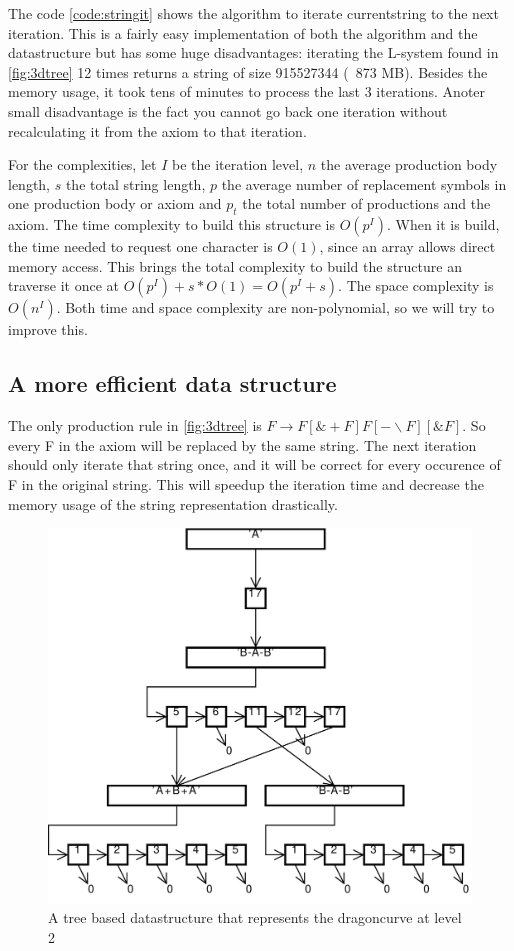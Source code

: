 \documentclass[11pt,a4paper]{article}
\begin{document}
The code \ref{code:stringit} shows the algorithm to iterate currentstring to the next iteration. This is a fairly easy implementation of both the algorithm and the datastructure but has some huge disadvantages: iterating the L-system found in \ref{fig:3dtree} 12 times returns a string of size 915527344 (~873 MB). Besides the memory usage, it took tens of minutes to process the last 3 iterations. Anoter small disadvantage is the fact you cannot go back one iteration without recalculating it from the axiom to that iteration.

For the complexities, let $I$ be the iteration level, $n$ the average production body length, $s$ the total string length, $p$ the average number of replacement symbols in one production body or axiom and $p_t$ the total number of productions and the axiom.
The time complexity to build this structure is $O(p^I)$. When it is build, the time needed to request one character is $O(1)$, since an array allows direct memory access. This brings the total complexity to build the structure an traverse it once at $O(p^I)+s*O(1) = O(p^I+s)$.
The space complexity is $O(n^I)$. Both time and space complexity are non-polynomial, so we will try to improve this.

\subsection{A more efficient data structure} %

The only production rule in \ref{fig:3dtree} is $F \rightarrow F[\&+F]F[-\backslash F][\&F]$. So every F in the axiom will be replaced by the same string. The next iteration should only iterate that string once, and it will be correct for every occurence of F in the original string. This will speedup the iteration time and decrease the memory usage of the string representation drastically.


\begin{figure}[h!]
  \centering
  \includegraphics[width=1\textwidth]{struct.pdf}
  \caption{A tree based datastructure that represents the dragoncurve at level 2}
  \label{fig:struct}
\end{figure}
\end{document}
